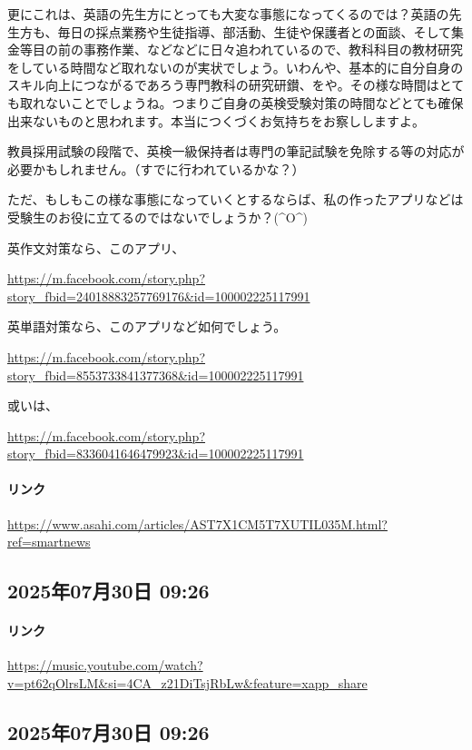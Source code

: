 更にこれは、英語の先生方にとっても大変な事態になってくるのでは？英語の先生方も、毎日の採点業務や生徒指導、部活動、生徒や保護者との面談、そして集金等目の前の事務作業、などなどに日々追われているので、教科科目の教材研究をしている時間など取れないのが実状でしょう。いわんや、基本的に自分自身のスキル向上につながるであろう専門教科の研究研鑚、をや。その様な時間はとても取れないことでしょうね。つまりご自身の英検受験対策の時間などとても確保出来ないものと思われます。本当につくづくお気持ちをお察ししますよ。

教員採用試験の段階で、英検一級保持者は専門の筆記試験を免除する等の対応が必要かもしれません。（すでに行われているかな？）

ただ、もしもこの様な事態になっていくとするならば、私の作ったアプリなどは受験生のお役に立てるのではないでしょうか？(\textasciicircum{}O\textasciicircum{})

英作文対策なら、このアプリ、

\url{https://m.facebook.com/story.php?story_fbid=24018883257769176&id=100002225117991}

英単語対策なら、このアプリなど如何でしょう。

\url{https://m.facebook.com/story.php?story_fbid=8553733841377368&id=100002225117991}

或いは、

\url{https://m.facebook.com/story.php?story_fbid=8336041646479923&id=100002225117991}

\paragraph{リンク}
\url{https://www.asahi.com/articles/AST7X1CM5T7XUTIL035M.html?ref=smartnews}

\subsection*{2025年07月30日 09:26}

\paragraph{リンク}
\url{https://music.youtube.com/watch?v=pt62qOlrsLM&si=4CA_z21DiTsjRbLw&feature=xapp_share}

\subsection*{2025年07月30日 09:26}

